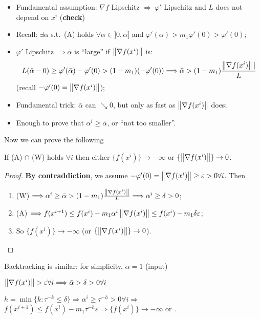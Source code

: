 \documentclass[ComputationalMathematics.tex]{subfiles}
\begin{document}
\begin{itemize}
 \item Fundamental assumption: $\nabla f$ Lipschitz $\Longrightarrow ~ \varphi'$ Lipschitz and $L$ does not depend on $x^i$ ({\bf check})
 \item Recall: $\exists \bar{\alpha}$ s.t.~(A) holds $\forall \alpha \in ]0, \bar{\alpha}]$ and $\varphi'(\bar{\alpha}) > m_1 \varphi'(0) > \varphi'(0)$;
 \item $\varphi'$ Lipschitz $\Longrightarrow \bar{\alpha}$ is ``large'' if $\left\lVert\nabla f(x^i)\right\rVert$ is: 
   \[
     L(\bar{\alpha} - 0) \geq \varphi'(\bar{\alpha}) - \varphi'(0)
        > (1 - m_1) (- \varphi'(0)) \Longrightarrow 
        \bar{\alpha} > (1 - m_1) \frac{\left\lVert\nabla f(x^i)\right\rVert|}{L}
  \]
       (recall $- \varphi'(0) = \left\lVert\nabla f(x^i)\right\rVert$);
 \item Fundamental trick: $\bar{\alpha}$ can $\searrow 0$, but only as fast as $\left\lVert\nabla f(x^i)\right\rVert$ does;
 \item Enough to prove that $\alpha^i \geq \bar{\alpha}$, or ``not too smaller''.
\end{itemize}

Now we can prove the following

\begin{theorem}
  If (A) $\cap$ (W) holds $\forall i$ then either $\{f(x^i)\} \to -\infty$ or $ \{\left\lVert\nabla f(x^i)\right\rVert\} \to 0$. 
\end{theorem}

\begin{proof}
  \textbf{By contraddiction}, we assume $- \varphi'(0) = \left\lVert\nabla f(x^i)\right\rVert \geq \varepsilon > 0 \forall i$. Then
  \begin{enumerate}
    \item (W) $\Longrightarrow \alpha^i \geq \bar{\alpha} > (1 - m_1) \frac{\left\lVert\nabla f(x^i)\right\rVert}{L} \Longrightarrow \alpha^i \geq \delta > 0$;
    \item (A) $\Longrightarrow f(x^{i+1}) \leq f(x^i) - m_1 \alpha^i \left\lVert\nabla f(x^i)\right\rVert \leq f(x^i) - m_1 \delta \varepsilon$;
    \item So $\{f(x^i)\} \to -\infty$ (or $ \{\left\lVert\nabla f(x^i)\right\rVert\} \to 0$).
  \end{enumerate}
\end{proof}

Backtracking is similar: for simplicity, $\alpha = 1$ (input)

      $\left\lVert\nabla f(x^i)\right\rVert > \varepsilon \forall i \Longrightarrow \bar{\alpha} > \delta > 0 \forall i$

      $h = \min \{k : \tau^{-k} \leq \delta\} \Longrightarrow \alpha^i \geq \tau^{-h} > 0 \forall i \Longrightarrow$ $f(x^{i+1}) \leq f(x^i) - m_1 \tau^{-h} \varepsilon \Longrightarrow \{f(x^i)\} \to -\infty$ or \faFlash.
\end{document}
